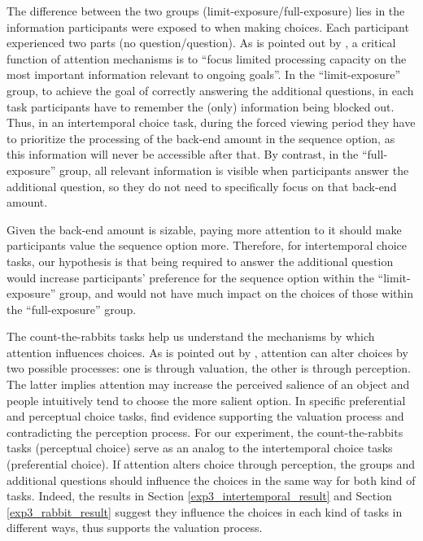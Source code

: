 \documentclass[
  12pt,
]{article}
\begin{document}
The difference between the two groups (limit-exposure/full-exposure)
lies in the information participants were exposed to when making
choices. Each participant experienced two parts (no question/question).
As is pointed out by \citet{chun2011taxonomy}, a critical function of
attention mechanisms is to ``focus limited processing capacity on the
most important information relevant to ongoing goals''. In the
``limit-exposure'' group, to achieve the goal of correctly answering the
additional questions, in each task participants have to remember the
(only) information being blocked out. Thus, in an intertemporal choice
task, during the forced viewing period they have to prioritize the
processing of the back-end amount in the sequence option, as this
information will never be accessible after that. By contrast, in the
``full-exposure'' group, all relevant information is visible when
participants answer the additional question, so they do not need to
specifically focus on that back-end amount.

Given the back-end amount is sizable, paying more attention to it should
make participants value the sequence option more. Therefore, for
intertemporal choice tasks, our hypothesis is that being required to
answer the additional question would increase participants' preference
for the sequence option within the ``limit-exposure'' group, and would
not have much impact on the choices of those within the
``full-exposure'' group.

The count-the-rabbits tasks help us understand the mechanisms by which
attention influences choices. As is pointed out by
\citet{pleskac2023attention}, attention can alter choices by two
possible processes: one is through valuation, the other is through
perception. The latter implies attention may increase the perceived
salience of an object and people intuitively tend to choose the more
salient option. In specific preferential and perceptual choice tasks,
\citet{pleskac2023attention} find evidence supporting the valuation
process and contradicting the perception process. For our experiment,
the count-the-rabbits tasks (perceptual choice) serve as an analog to
the intertemporal choice tasks (preferential choice). If attention
alters choice through perception, the groups and additional questions
should influence the choices in the same way for both kind of tasks.
Indeed, the results in Section \ref{exp3_intertemporal_result} and
Section \ref{exp3_rabbit_result} suggest they influence the choices in
each kind of tasks in different ways, thus supports the valuation
process.
\end{document}

